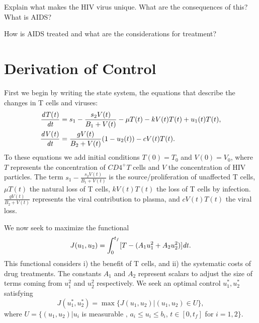 % 

   
\begin{problem}
Explain what makes the HIV virus unique. What are the consequences of this? What is AIDS?
\label{problem:hiv:virusunderstanding}
\end{problem}

\begin{problem}
How is AIDS treated and what are the considerations for treatment?
\label{problem:hiv:treatment}
\end{problem}

\section*{Derivation of Control}
First we begin by writing the state system, the equations that describe the changes in T cells and viruses:
\begin{align*}
\frac{\it{d}T(t)}{\it{dt}} &= s_1 - \frac{s_2V(t)}{B_1+V(t)} - \mu T(t)-kV(t)T(t)+u_1(t)T(t), \\
\frac{\it{d}V(t)}{\it{dt}} &= \frac{gV(t)}{B_2+V(t)}(1-u_2(t)) - cV(t)T(t).
\end{align*}
To these equations we add initial conditions $T(0)=T_0$ and $V(0)=V_0$, where $T$ represents the concentration of $CD4^+T$ cells and $V$ the concentration of HIV particles. 
The term $s_1-\frac{s_2V(t)}{B_1+V(t)}$ is the source/proliferation of unaffected T cells,
$\mu T(t)$ the natural loss of T cells, $kV(t)T(t)$ the loss of T cells by infection. 
$\frac{gV(t)}{B_2+V(t)}$ represents the viral contribution to plasma, and $cV(t)T(t)$ the viral loss.

We now seek to maximize the functional 
\[
J(u_1,u_2) = \int_0^{t_f}[T-(A_1u_1^2+A_2u_2^2)]\it{dt}.
\]
This functional considers i) the benefit of T cells, and ii) the systematic costs of drug treatments.
The constants $A_1$ and $A_2$ represent scalars to adjust the size of terms coming from $u_1^2$ and $u_2^2$ respectively. 
We seek an optimal control $u_1^*,u_2^*$ satisfying
\[
J(u_1^*,u_2^*)=\max\{J(u_1,u_2)|(u_1,u_2)\in U\},
\]
where $U=\{(u_1,u_2)|u_i $ is measurable $,\,a_i\le u_i \le b_i$, $t\in[0,t_f]$ for $i=1,2\}$.
 
